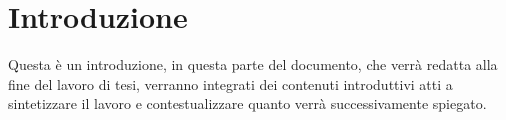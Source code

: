 \chapter{Introduzione}

Questa è un introduzione, in questa parte del documento, che verrà redatta alla
fine del lavoro di tesi, verranno integrati dei contenuti introduttivi atti a
sintetizzare il lavoro e contestualizzare quanto verrà successivamente spiegato.

\endinput